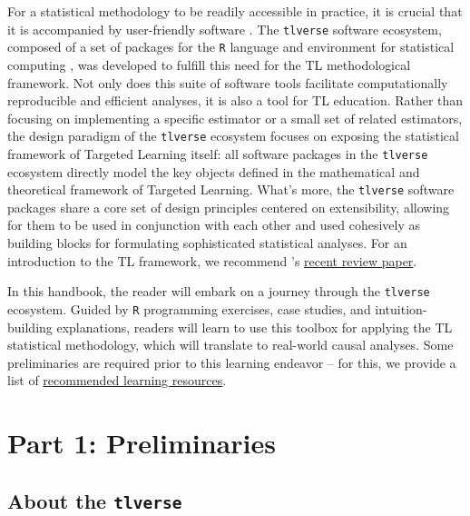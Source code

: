 \documentclass[
  12pt, krantz2,
]{krantz}
\newcommand{\passthrough}[1]{#1}
\newcommand{\1}{\mathbbm{1}}
\theoremstyle{definition}
\theoremstyle{definition}
\theoremstyle{definition}
\theoremstyle{definition}
\theoremstyle{remark}
\begin{document}
For a statistical methodology to be readily accessible in practice, it is
crucial that it is accompanied by user-friendly software
\citep{pullenayegum2016knowledge, stromberg2004write}. The \passthrough{\lstinline!tlverse!} software
ecosystem, composed of a set of packages for the \passthrough{\lstinline!R!} language and environment for
statistical computing \citep{R}, was developed to fulfill this need for the TL
methodological framework. Not only does this suite of software tools
facilitate computationally reproducible and efficient analyses, it is also a
tool for TL education. Rather than focusing on implementing a specific estimator
or a small set of related estimators, the design paradigm of the \passthrough{\lstinline!tlverse!}
ecosystem focuses on exposing the statistical framework of Targeted Learning
itself: all software packages in the \passthrough{\lstinline!tlverse!} ecosystem directly model the key
objects defined in the mathematical and theoretical framework of Targeted
Learning. What's more, the \passthrough{\lstinline!tlverse!} software packages share a core set of
design principles centered on extensibility, allowing for them to be used in
conjunction with each other and used cohesively as building blocks for
formulating sophisticated statistical analyses. For an introduction to the TL
framework, we recommend \citet{coyle2021targeted}'s \href{https://arxiv.org/abs/2006.07333}{recent review
paper}.

In this handbook, the reader will embark on a journey through the \passthrough{\lstinline!tlverse!}
ecosystem. Guided by \passthrough{\lstinline!R!} programming exercises, case studies, and
intuition-building explanations, readers will learn to use this toolbox for
applying the TL statistical methodology, which will translate to real-world
causal analyses. Some preliminaries are required prior to this learning endeavor
-- for this, we provide a list of \protect\hyperlink{learn}{recommended learning resources}.

\hypertarget{part-part-1-preliminaries}{%
\part{Part 1: Preliminaries}\label{part-part-1-preliminaries}}

\hypertarget{tlverse}{%
\chapter{\texorpdfstring{About the \texttt{tlverse}}{About the tlverse}}\label{tlverse}}
\end{document}
